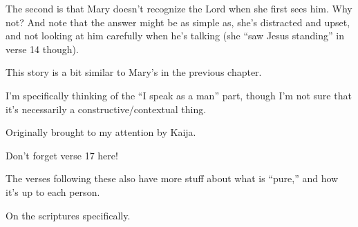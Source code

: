 \begin{compactdesc}
\begin{compactitem}
						\item The second is that Mary doesn't recognize the Lord when she first sees him. Why not? And note that the answer might be as simple as, she's distracted and upset, and not looking at him carefully when he's talking (she ``saw Jesus standing'' in verse 14 though).
					\end{compactitem}
				\item[{\hyperref[JOHN-21-4]{John 21:4--12}}] \phantom{.}
					\begin{compactitem}
						\item This story is a bit similar to Mary's in the previous chapter.
					\end{compactitem}
				\item[{\hyperref[ROMANS-3-5]{Romans 3:5}}] \phantom{.}
					\begin{compactitem}
						\item I'm specifically thinking of the ``I speak as a man'' part, though I'm not sure that it's necessarily a constructive/contextual thing.
					\end{compactitem}
				\item[{\hyperref[ROMANS-3-20]{Romans 3:20}}]
				\item[{\hyperref[ROMANS-6-19]{Romans 6:19}}] \phantom{.}
					\begin{compactitem}
						\item Originally brought to my attention by Kaija.
					\end{compactitem}
				\item[{\hyperref[ROMANS-10-13]{Romans 10:13--15, 17}}] \phantom{.}
					\begin{compactitem}
						\item Don't forget verse 17 here!
					\end{compactitem}
				\item[{\hyperref[ROMANS-11-33]{Romans 11:33--36}}]
				\item[{\hyperref[ROMANS-14-13]{Romans 14:13--14}}] \phantom{.}
					\begin{compactitem}
						\item The verses following these also have more stuff about what is ``pure,'' and how it's up to each person.
					\end{compactitem}
				\item[{\hyperref[ROMANS-15-4]{Romans 15:4}}] \phantom{.}
					\begin{compactitem}
						\item On the scriptures specifically.

\end{compactitem}
\end{compactdesc}
